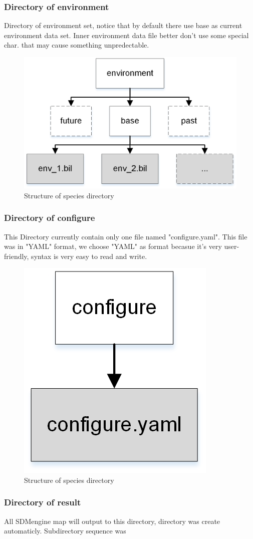 \documentclass[10pt,a4paper]{report}
\begin{document}
\subsubsection{Directory of environment}
Directory of environment set, notice that by default there use base as current environment data set. Inner environment data file better don't use some special char. that may cause something unpredectable.

\begin{figure}[h]
\centering
\includegraphics[angle=0,width=0.55\linewidth]{environment_directory.jpg}
\caption[workshop]{Structure of species directory}
\label{fig:workshop_structure}
\end{figure}

\subsubsection{Directory of configure}
This Directory currently contain only one file named "configure.yaml". This file was in "YAML" format, we choose "YAML" as format becasue it's very user-friendly, syntax is very easy to read and write.

\begin{figure}[h]
\centering
\includegraphics[angle=0,width=0.2\linewidth]{configure.jpg}
\caption[workshop]{Structure of species directory}
\label{fig:workshop_structure}
\end{figure}



\subsubsection{Directory of result}
All SDMengine map will output to this directory, directory was create automaticly. Subdirectory sequence was
\end{document}
